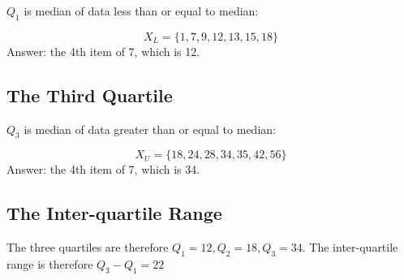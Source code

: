 \documentclass[a4paper,12pt]{article}
\begin{document}
$Q_1$ is median of data less than or equal to median: 

\[X_{L} = \{1,7,  9, 12, 13, 15, 18\} \]
Answer: the 4th item of 7, which is 12.

\subsection*{The Third Quartile}

$Q_3$ is median of data greater than or equal to median:



\[X_{U} = \{18,  24, 28, 34, 35, 42, 56\}\] 
Answer: the 4th item of 7, which is 34.



\subsection*{The Inter-quartile Range}
The three quartiles are therefore $Q_1 = 12, Q_2 = 18, Q_3 = 34$.
The inter-quartile range is therefore $Q_3 - Q_1 = 22$

\end{document}
